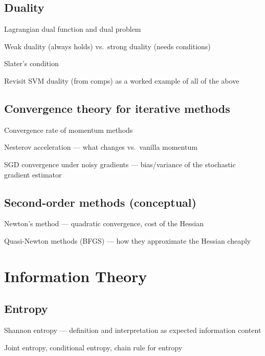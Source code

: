 \subsection{Duality}
\begin{tasklist}
    \item Lagrangian dual function and dual problem
    \item Weak duality (always holds) vs.\ strong duality (needs conditions)
    \item Slater's condition
    \item Revisit SVM duality (from comps) as a worked example of all of the above
\end{tasklist}

\subsection{Convergence theory for iterative methods}
\begin{tasklist}
    \item Convergence rate of momentum methods
    \item Nesterov acceleration — what changes vs.\ vanilla momentum
    \item SGD convergence under noisy gradients — bias/variance of the stochastic gradient estimator
\end{tasklist}

\subsection{Second-order methods (conceptual)}
\begin{tasklist}
    \item Newton's method — quadratic convergence, cost of the Hessian
    \item Quasi-Newton methods (BFGS) — how they approximate the Hessian cheaply
\end{tasklist}

\section{Information Theory}

\subsection{Entropy}
\begin{tasklist}
    \item Shannon entropy — definition and interpretation as expected information content
    \item Joint entropy, conditional entropy, chain rule for entropy
\end{tasklist}

